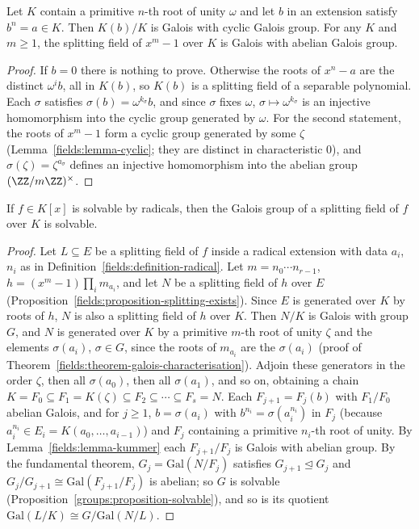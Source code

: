 \begin{lemma}\label{fields:lemma-kummer}
Let $K$ contain a primitive $n$-th root of unity $\omega$ and let $b$ in an extension satisfy
$b^n = a \in K$. Then $K(b)/K$ is Galois with cyclic Galois group. For any $K$ and $m \geq 1$, the
splitting field of $x^m - 1$ over $K$ is Galois with abelian Galois group.
\end{lemma}

\begin{proof}
If $b = 0$ there is nothing to prove. Otherwise the roots of $x^n - a$ are the distinct
$\omega^i b$, all in $K(b)$, so $K(b)$ is a splitting field of a separable polynomial. Each $\sigma$
satisfies $\sigma(b) = \omega^{k_\sigma}b$, and since $\sigma$ fixes $\omega$, $\sigma \mapsto \omega^{k_\sigma}$ is an injective
homomorphism into the cyclic group generated by $\omega$. For the second statement, the roots
of $x^m - 1$ form a cyclic group generated by some $\zeta$ (Lemma~\ref{fields:lemma-cyclic};
they are distinct in characteristic $0$), and $\sigma(\zeta) = \zeta^{a_\sigma}$ defines an injective
homomorphism into the abelian group $(\ZZ/m\ZZ)^\times$.
\end{proof}

\begin{theorem}[Galois]\label{fields:theorem-galois-radicals}
If $f \in K[x]$ is solvable by radicals, then the Galois group of a splitting field of $f$ over $K$
is solvable.
\end{theorem}

\begin{proof}
Let $L \subseteq E$ be a splitting field of $f$ inside a radical extension with data $a_i$, $n_i$ as in
Definition~\ref{fields:definition-radical}. Let $m = n_0 \cdots n_{r-1}$, $h = (x^m - 1)\prod_i m_{a_i}$, and
let $N$ be a splitting field of $h$ over $E$ (Proposition~\ref{fields:proposition-splitting-exists}).
Since $E$ is generated over $K$ by roots of $h$, $N$ is also a splitting field of $h$ over $K$.
Then $N/K$ is Galois with group $G$, and $N$ is generated over $K$ by a primitive $m$-th root of unity $\zeta$ and the elements
$\sigma(a_i)$, $\sigma \in G$, since the roots of $m_{a_i}$ are the $\sigma(a_i)$ (proof of
Theorem~\ref{fields:theorem-galois-characterisation}). Adjoin these generators in the order
$\zeta$, then all $\sigma(a_0)$, then all $\sigma(a_1)$, and so on, obtaining a chain
$K = F_0 \subseteq F_1 = K(\zeta) \subseteq F_2 \subseteq \cdots \subseteq F_s = N$. Each $F_{j+1} = F_j(b)$ with $F_1/F_0$
abelian Galois, and for $j \geq 1$, $b = \sigma(a_i)$ with $b^{n_i} = \sigma(a_i^{n_i})$ in $F_j$ (because
$a_i^{n_i} \in E_i = K(a_0, \ldots, a_{i-1})$) and $F_j$ containing a primitive $n_i$-th root of unity. By
Lemma~\ref{fields:lemma-kummer} each $F_{j+1}/F_j$ is Galois with abelian group. By the fundamental
theorem, $G_j = \mathrm{Gal}(N/F_j)$ satisfies $G_{j+1} \trianglelefteq G_j$ and
$G_j/G_{j+1} \cong \mathrm{Gal}(F_{j+1}/F_j)$ is abelian; so $G$ is solvable
(Proposition~\ref{groups:proposition-solvable}), and so is its quotient
$\mathrm{Gal}(L/K) \cong G/\mathrm{Gal}(N/L)$.
\end{proof}

